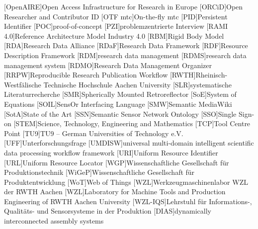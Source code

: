 \begin{acronym}[Abbreviations]
    [OpenAIRE]{Open Access Infrastructure for Research in Europe}
    [ORCiD]{Open Researcher and Contributor ID}
    [OTF \acs*{mtc}]{On-the-fly \acl*{mtc}}
    [PID]{Persistent Identifier}
    [POC]{proof-of-concept} 
	[PZI]{problemzentrierte Interview}
    [RAMI 4.0]{Reference Architecture Model Industry 4.0}
    [RBM]{Rigid Body Model}
    [RDA]{Research Data Alliance}
    [RDaF]{Research Data Framework}
    [RDF]{Resource Description Framework}
    [RDM]{research data management}
    [RDMS]{research data management system}
    [RDMO]{Research Data Management Organizer}
    [RRPW]{Reproducible Research Publication Workflow}
    [RWTH]{Rheinisch-Westfälische Technische Hochschule Aachen University}
    [SLR]{systematische Literaturrecherche}
    [SMR]{Spherically Mounted Retroreflector}
    [SoE]{System of Equations}
    [SOIL]{SensOr Interfacing Language}
    [SMW]{Semantic MediaWiki}
    [SotA]{State of the Art}
    [SSN]{Semantic Sensor Network Ontology}
    [SSO]{Single Sign-on}
    [STEM]{Science, Technology, Engineering and Mathematics}
    [TCP]{Tool Centre Point}
	[TU9]{TU9 – German Universities of Technology e.V.}
	[UFF]{Unterforschungsfrage}
    [UMDISW]{universal multi-domain intelligent scientific data processing workflow framework}
    [URI]{Uniform Resource Identifier}
    [URL]{Uniform Resource Locator}
	[WGP]{Wissenschaftliche Gesellschaft für Produktionstechnik}
	[WiGeP]{Wissenschaftliche Gesellschaft für Produktentwicklung}
    [WoT]{Web of Things}
	[WZL]{Werkzeugmaschinenlabor WZL der RWTH Aachen}
	[WZL]{Laboratory for Machine Tools and Production Engineering of RWTH Aachen University}
	[WZL-IQS]{Lehrstuhl für Informations-, Qualitäts- und Sensorsysteme
	in der Produktion 
	}
    [DIAS]{dynamically interconnected assembly systems}
    \end{acronym}
